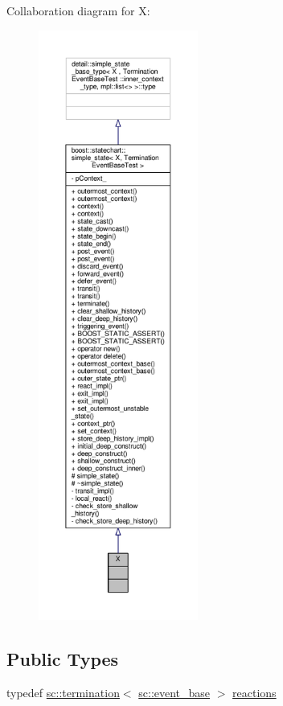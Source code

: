 Collaboration diagram for X\+:
\nopagebreak
\begin{figure}[H]
\begin{center}
\leavevmode
\includegraphics[height=550pt]{struct_x__coll__graph}
\end{center}
\end{figure}
\subsection*{Public Types}
\begin{DoxyCompactItemize}
\item 
typedef \mbox{\hyperlink{classboost_1_1statechart_1_1termination}{sc\+::termination}}$<$ \mbox{\hyperlink{classboost_1_1statechart_1_1event__base}{sc\+::event\+\_\+base}} $>$ \mbox{\hyperlink{struct_x_a09a50a25894eeeafb9f2d6ef00334902}{reactions}}
\end{DoxyCompactItemize}
